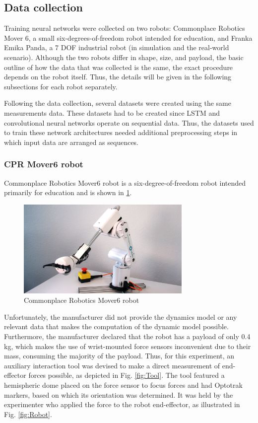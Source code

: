 \subsection{Data collection}

Training neural networks were collected on two robots: Commonplace Robotics Mover 6, a small six-degrees-of-freedom robot intended for education, and Franka Emika Panda, a 7 DOF industrial robot (in simulation and the real-world scenario). Although the two robots differ in shape, size, and payload, the basic outline of how the data that was collected is the same, the exact procedure depends on the robot itself. Thus, the details will be given in the following subsections for each robot separately.

Following the data collection, several datasets were created using the same measurements data. These datasets had to be created since LSTM and convolutional neural networks operate on sequential data. Thus, the datasets used to train these network architectures needed additional preprocessing steps in which input data are arranged as sequences.

\subsubsection{CPR Mover6 robot}

Commonplace Robotics Mover6 robot is a six-degree-of-freedom robot intended primarily for education \cite{Mover6} and is shown in \cref{fig:Mover6}. 

\begin{figure}
    \centering
    \includegraphics[width=0.75\textwidth]{slike/Fig03_19.jpg}
    \caption[Commonplace Robotics Mover6 robot]{Commonplace Robotics Mover6 robot \cite{Mover6}}
    \label{fig:Mover6}
\end{figure}

Unfortunately, the manufacturer did not provide the dynamics model or any relevant data that makes the computation of the dynamic model possible. Furthermore, the manufacturer declared that the robot has a payload of only 0.4 kg, which makes the use of wrist-mounted force sensors inconvenient due to their mass, consuming the majority of the payload. Thus, for this experiment, an auxiliary interaction tool was devised to make a direct measurement of end-effector forces possible, as depicted in Fig. \ref{fig:Tool}. The tool featured a hemispheric dome placed on the force sensor to focus forces and had Optotrak markers, based on which its orientation was determined. It was held by the experimenter who applied the force to the robot end-effector, as illustrated in Fig. \ref{fig:Robot}. 

